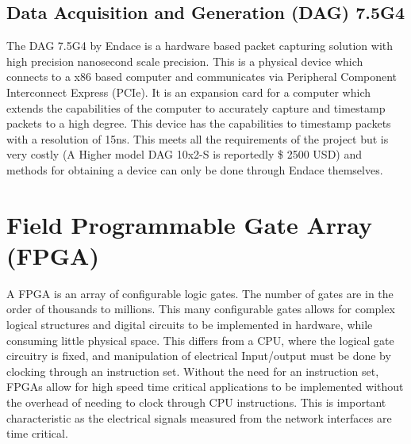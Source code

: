 \subsection{Data Acquisition and Generation (DAG) 7.5G4}

The DAG 7.5G4 by Endace is a hardware based packet capturing solution with high precision
nanosecond scale precision. This is a physical device which connects to a x86 based computer and
communicates via Peripheral Component Interconnect Express (PCIe). It is an expansion card for a
computer which extends the capabilities of the computer to accurately capture and timestamp
packets to a high degree. This device has the capabilities to timestamp packets with a resolution of
15ns. This meets all the requirements of the project but is very costly (A Higher model DAG 10x2-S is
reportedly \$ 2500 USD) and methods for obtaining a device can only be done through Endace
themselves.

\section{Field Programmable Gate Array (FPGA)}

A FPGA is an array of configurable logic gates. The number of gates are in the order of thousands to
millions. This many configurable gates allows for complex logical structures and digital circuits to be
implemented in hardware, while consuming little physical space. This differs from a CPU, where the
logical gate circuitry is fixed, and manipulation of electrical Input/output must be done by clocking
through an instruction set. Without the need for an instruction set, FPGAs allow for high speed time
critical applications to be implemented without the overhead of needing to clock through CPU
instructions. This is important characteristic as the electrical signals measured from the network
interfaces are time critical.

